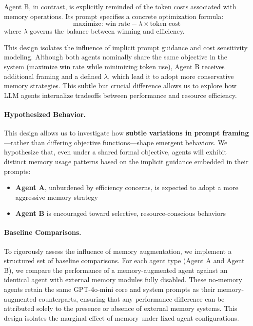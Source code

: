 \documentclass[10pt]{article}
\begin{document}
Agent B, in contrast, is explicitly reminded of the token costs associated with memory operations. Its prompt specifies a concrete optimization formula:
$$
\text{maximize: win rate} - \lambda \times \text{token cost}
$$
where $\lambda$ governs the balance between winning and efficiency.

This design isolates the influence of implicit prompt guidance and cost sensitivity modeling. Although both agents nominally share the same objective in the system (maximize win rate while minimizing token use), Agent B receives additional framing and a defined $\lambda$, which lead it to adopt more conservative memory strategies. This subtle but crucial difference allows us to explore how LLM agents internalize tradeoffs between performance and resource efficiency.

\paragraph{Hypothesized Behavior.} This design allows us to investigate how \textbf{subtle variations in prompt framing}---rather than differing objective functions---shape emergent behaviors. We hypothesize that, even under a shared formal objective, agents will exhibit distinct memory usage patterns based on the implicit guidance embedded in their prompts:
\begin{itemize}[leftmargin=*,nosep]
    \item \textbf{Agent A}, unburdened by efficiency concerns, is expected to adopt a more aggressive memory strategy
    \item \textbf{Agent B} is encouraged toward selective, resource-conscious behaviors
\end{itemize}

\paragraph{Baseline Comparisons.}
To rigorously assess the influence of memory augmentation, we implement a structured set of baseline comparisons. For each agent type (Agent A and Agent B), we compare the performance of a memory-augmented agent against an identical agent with external memory modules fully disabled. These no-memory agents retain the same GPT-4o-mini core and system prompts as their memory-augmented counterparts, ensuring that any performance difference can be attributed solely to the presence or absence of external memory systems. This design isolates the marginal effect of memory under fixed agent configurations.
\end{document}
